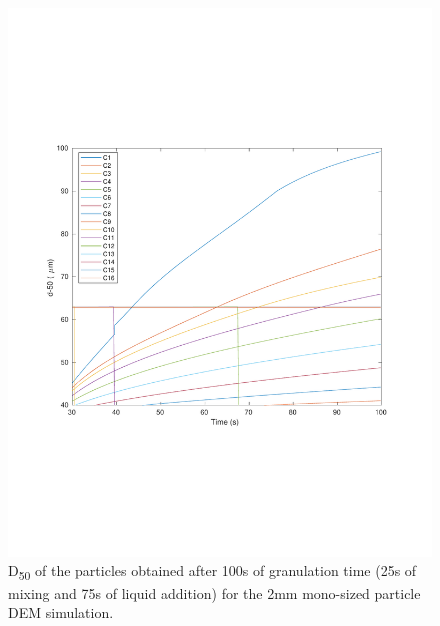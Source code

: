\documentclass[preprint,11pt,authoryear]{elsarticle}
\begin{document}

\begin{figure}
\centering
\includegraphics[scale=0.5]{rslts_pbm_d50_128_200.pdf}
\caption{D\textsubscript{50} of the particles obtained after 100s of granulation time (25s of mixing and 75s of 
liquid addition) for the 2mm mono-sized particle DEM simulation.}
\label{fig:rslts_PBM_2mm_d50}
\end{figure}
\end{document}
